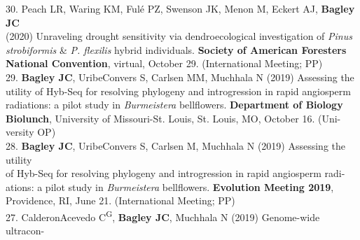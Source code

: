 \documentclass[margin,line]{res}
\begin{document}
\begin{resume}
30. Peach LR, Waring KM, Ful\'{e} PZ, Swenson JK, Menon M, Eckert AJ, \textbf{Bagley JC} \\
\hspace*{8mm} (2020) Unraveling drought sensitivity via dendroecological investigation of \emph{Pinus} \\
\hspace*{8mm} \emph{strobiformis} \& \emph{P. flexilis} hybrid individuals. \textbf{Society of American Foresters} \\ \vspace{2mm}
\hspace*{8mm}\textbf{National Convention}, virtual, October 29. (International Meeting; PP) \\
29. \textbf{Bagley JC}, Uribe\textendash Convers S, Carlsen MM, Muchhala N (2019) Assessing the\\
\hspace*{8mm} utility of Hyb-Seq for resolving phylogeny and introgression in rapid angiosperm\\
\hspace*{8mm} radiations: a pilot study in \emph{Burmeistera} bellflowers. \textbf{Department of Biology}\\
\hspace*{8mm} \textbf{Biolunch}, University of Missouri-St. Louis, St. Louis, MO, October 16. (Uni-\\ \vspace{2mm}
\hspace*{8mm}versity OP) \\
28. \textbf{Bagley JC}, Uribe\textendash Convers S, Carlsen M, Muchhala N (2019) Assessing the utility\\
\hspace*{8mm} of Hyb-Seq for resolving phylogeny and introgression in rapid angiosperm radi-\\
\hspace*{8mm} ations: a pilot study in \emph{Burmeistera} bellflowers. \textbf{Evolution Meeting 2019},\\ \vspace{2mm}
\hspace*{8mm}Providence, RI, June 21. (International Meeting; PP) \\
27. Calderon\textendash Acevedo C\textsuperscript{G}, \textbf{Bagley JC}, Muchhala N (2019) Genome-wide ultracon-\\

\end{resume}
\end{document}
